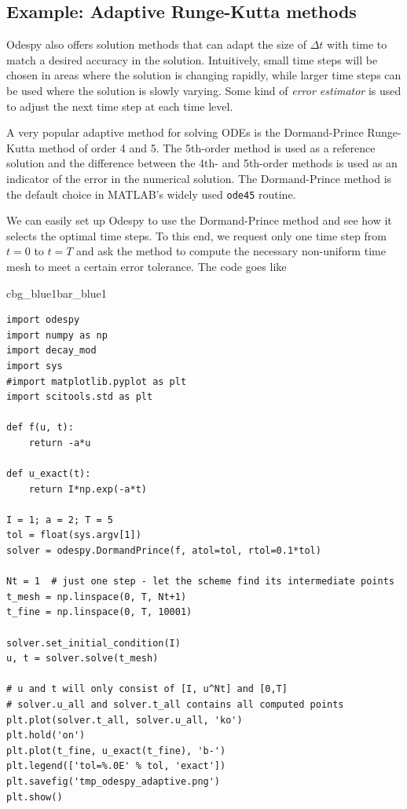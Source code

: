 \documentclass[%
oneside,                 %
final,                   %
10pt]{article}
\newenvironment{_pro_tight}[2]{
   \def\FrameCommand{\color{#2}\vrule width 1mm\normalcolor\colorbox{#1}}
   \FrameRule0.6pt\MakeFramed {\advance\hsize-2mm\FrameRestore}\vskip3mm}
   {\vskip0mm\endMakeFramed}
\newenvironment{pro}[2]{
\bgroup\rmfamily
\fboxsep=0mm\relax
\begin{_pro_tight}{#1}{#2}
\list{}{\parsep=-2mm\parskip=0mm\topsep=0pt\leftmargin=2mm
\rightmargin=2\leftmargin\leftmargin=4pt\relax}
\item\relax}
{\endlist\end{_pro_tight}\egroup}
\begin{document}
\subsection{Example: Adaptive Runge-Kutta methods}
\label{decay:fd2:adaptiveRK}


Odespy also offers solution methods that can adapt the size of $\Delta t$
with time to match a desired accuracy in the solution. Intuitively,
small time steps will be chosen in areas where the solution is changing
rapidly, while larger time steps can be used where the solution
is slowly varying. Some kind of \emph{error estimator} is used to
adjust the next time step at each time level.

 

A very popular adaptive method for solving ODEs is the Dormand-Prince
Runge-Kutta method of order 4 and 5. The 5th-order method is used as a
reference solution and the difference between the 4th- and 5th-order
methods is used as an indicator of the error in the numerical
solution.  The Dormand-Prince method is the default choice in MATLAB's
widely used \texttt{ode45} routine.

We can easily set up Odespy to use the Dormand-Prince method and
see how it selects the optimal time steps. To this end, we request
only one time step from $t=0$ to $t=T$ and ask the method to
compute the necessary non-uniform time mesh to meet a certain
error tolerance. The code goes like

\begin{pro}{cbg_blue1}{bar_blue1}\begin{Verbatim}[numbers=none,fontsize=\fontsize{9pt}{9pt},baselinestretch=0.95,xleftmargin=2mm]
import odespy
import numpy as np
import decay_mod
import sys
#import matplotlib.pyplot as plt
import scitools.std as plt

def f(u, t):
    return -a*u

def u_exact(t):
    return I*np.exp(-a*t)

I = 1; a = 2; T = 5
tol = float(sys.argv[1])
solver = odespy.DormandPrince(f, atol=tol, rtol=0.1*tol)

Nt = 1  # just one step - let the scheme find its intermediate points
t_mesh = np.linspace(0, T, Nt+1)
t_fine = np.linspace(0, T, 10001)

solver.set_initial_condition(I)
u, t = solver.solve(t_mesh)

# u and t will only consist of [I, u^Nt] and [0,T]
# solver.u_all and solver.t_all contains all computed points
plt.plot(solver.t_all, solver.u_all, 'ko')
plt.hold('on')
plt.plot(t_fine, u_exact(t_fine), 'b-')
plt.legend(['tol=%.0E' % tol, 'exact'])
plt.savefig('tmp_odespy_adaptive.png')
plt.show()
\end{Verbatim}
\end{pro}
\noindent
\end{document}
